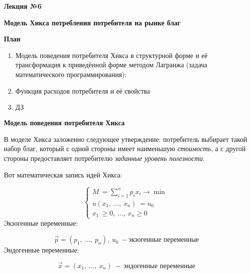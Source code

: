 \documentclass[12pt,a4paper]{article}
\author{Аверьянов Тимофей, Корякин Алексей}
\begin{document}
\begin{center}
\textbf{Лекция №6}

\textbf{Модель Хикса потребления потребителя на рынке благ}

\textbf{План}
\end{center}

\begin{enumerate}
\item  Модель поведения потребителя Хикса в структурной форме и её трансформация к приведённой форме методом Лагранжа (задача математического программирования);
\item  Функция расходов потребителя и её свойства
\item $\displaystyle \boxed{\text{ДЗ}}$
\end{enumerate}
\begin{center}
\textbf{Модель поведения потребителя Хикса}
\end{center}
	В моделе Хикса заложенно следующее утверждение: потребитель выбирает такой набор благ, который с одной стороны имеет наименьшую \textit{стоимость}, а с другой стороны предоставляет потребителю \textit{заданные уровень полезности}.

	Вот математическая запись идей Хикса:


\begin{equation}
\begin{cases}
M\ ={\displaystyle \sum ^{n}_{i=1} p_{i} x_{i}\rightarrow \min}\\
u( x_{1} ,\ \dotsc ,\ x_{n}) \ =u_{0}\\
x_{1} \ \geq 0,\ \dotsc ,\ x_{n} \geq 0
\end{cases}
\end{equation}
Экзогенные переменные:


\begin{equation*}
\vec{p} =( p_{1} ,\ \dotsc ,\ p_{n}) ,\ u_{0} \ -\text{экзогенные переменные}
\end{equation*}
Эндогенные переменные:


\begin{equation*}
\vec{x} =( x_{1} ,\ \dotsc ,\ x_{n}) \ -\ \text{эндогенные переменные}
\end{equation*}
\end{document}
